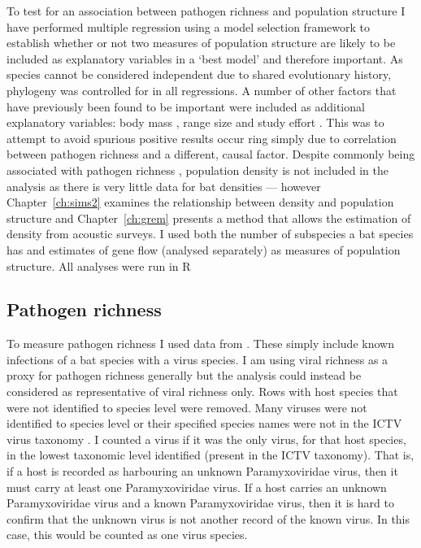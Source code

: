 To test for an association between pathogen richness and population structure I have performed multiple regression using a model selection framework to establish whether or not two measures of population structure are likely to be included as explanatory variables in a `best model' and therefore important.
As species cannot be considered independent due to shared evolutionary history, phylogeny was controlled for in all regressions.
A number of other factors that have previously been found to be important were included as additional explanatory variables: body mass \cite{kamiya2014determines, turmelle2009correlates, gay2014parasite, maganga2014bat, han2015infectious}, range size \cite{kamiya2014determines, turmelle2009correlates, maganga2014bat} and study effort \cite{turmelle2009correlates, gay2014parasite, maganga2014bat}.
This was to attempt to avoid spurious positive results occur  ring simply due to correlation between pathogen richness and a different, causal factor.
Despite commonly being associated with pathogen richness \cite{arneberg2002host, kamiya2014determines, nunn2003comparative}, population density is not included in the analysis as there is very little data for bat densities --- however Chapter~\ref{ch:sims2} examines the relationship between density and population structure and Chapter~\ref{ch:grem} presents a method that allows the estimation of density from acoustic surveys.
I used both the number of subspecies a bat species has and estimates of gene flow (analysed separately) as measures of population structure.
All analyses were run in R \cite{R}

\subsection{Pathogen richness}

To measure pathogen richness I used data from \cite{luis2013comparison}. 
These simply include known infections of a bat species with a virus species. 
I am using viral richness as a proxy for pathogen richness generally but the analysis could instead be considered as representative of viral richness only.
Rows with host species that were not identified to species level were removed.
Many viruses were not identified to species level or their specified species names were not in the ICTV virus taxonomy \cite{ICTV}.
I counted a virus if it was the only virus, for that host species, in the lowest taxonomic level identified (present in the ICTV taxonomy).
That is, if a host is recorded as harbouring an unknown Paramyxoviridae virus, then it must carry at least one Paramyxoviridae virus.
If a host carries an unknown Paramyxoviridae virus and a known Paramyxoviridae virus, then it is hard to confirm that the unknown virus is not another record of the known virus.
In this case, this would be counted as one virus species.






